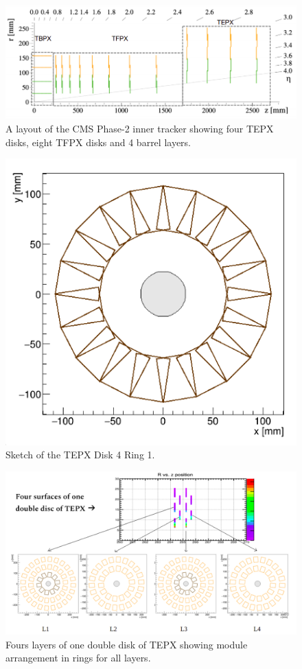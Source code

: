 \begin{figure}[H]
  \centering
  \includegraphics[width=0.8\columnwidth]{./tepx_geometry.png}
  \caption{ \onehalfspacing A layout of the CMS Phase-2 inner tracker showing four TEPX disks, eight TFPX disks and 4 barrel layers. \cite{Klein:2017nke}}
  \label{fig:CMS}
\end{figure}


\begin{figure}[H]
  \centering
  \includegraphics[width=0.4 \columnwidth]{./D4R1.png}
  \caption{ \onehalfspacing Sketch of the TEPX Disk 4 Ring 1.}
  \label{fig:CMS}
\end{figure}

\begin{figure}[H]
  \centering
  \includegraphics[width=1 \columnwidth]{./fourlayers.png}
  \caption{ \onehalfspacing Fours layers of one double disk of TEPX showing module arrangement in rings for all layers.}
  \label{fig:CMS}
\end{figure}




